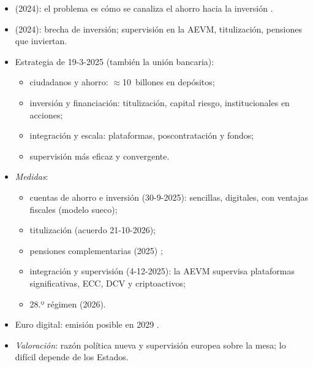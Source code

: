 \documentclass{article}
\begin{document}
\begin{columnas}
\begin{itemize}
\item {} (2024): el problema es cómo se canaliza el ahorro hacia la inversión .
\item {} (2024): brecha de inversión; supervisión en la AEVM, titulización, pensiones que inviertan.
\item Estrategia de 19-3-2025 (también la unión bancaria):
  \begin{itemize}
  \item ciudadanos y ahorro: $\approx$10~billones en depósitos;
  \item inversión y financiación: titulización, capital riesgo, institucionales en acciones;
  \item integración y escala: plataformas, poscontratación y fondos;
  \item supervisión más eficaz y convergente.
  \end{itemize}
\item \emph{Medidas}:
  \begin{itemize}
  \item cuentas de ahorro e inversión (30-9-2025): sencillas, digitales, con ventajas fiscales (modelo sueco);
  \item titulización (acuerdo 21-10-2026);
  \item pensiones complementarias (2025) ;
  \item integración y supervisión (4-12-2025): la AEVM supervisa plataformas significativas, ECC, DCV y criptoactivos;
  \item 28.º régimen (2026).
  \end{itemize}
\item Euro digital: emisión posible en 2029 .
\item \emph{Valoración}: razón política nueva y supervisión europea sobre la mesa; lo difícil depende de los Estados.
\end{itemize}


\end{columnas}
\end{document}
